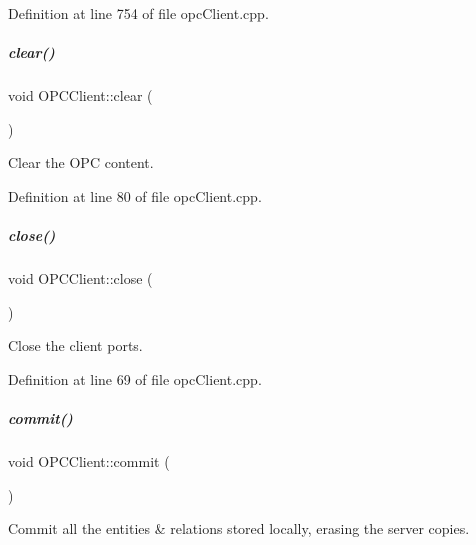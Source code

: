 Definition at line 754 of file opc\+Client.\+cpp.

\mbox{\label{group__icubclient__clients_ae884577090108846f1b0015818a2f13d}} 
\subparagraph{\texorpdfstring{clear()}{clear()}}
{\footnotesize\ttfamily void O\+P\+C\+Client\+::clear (\begin{DoxyParamCaption}{ }\end{DoxyParamCaption})}



Clear the O\+PC content. 



Definition at line 80 of file opc\+Client.\+cpp.

\mbox{\label{group__icubclient__clients_a4b193fe61992f927591ea0e5ff2a6f66}} 
\subparagraph{\texorpdfstring{close()}{close()}}
{\footnotesize\ttfamily void O\+P\+C\+Client\+::close (\begin{DoxyParamCaption}{ }\end{DoxyParamCaption})}



Close the client ports. 



Definition at line 69 of file opc\+Client.\+cpp.

\mbox{\label{group__icubclient__clients_a79bec5f248fcff8ae539b2cd285950a3}} 
\subparagraph{\texorpdfstring{commit()}{commit()}\hspace{0.1cm}{\footnotesize\ttfamily [1/2]}}
{\footnotesize\ttfamily void O\+P\+C\+Client\+::commit (\begin{DoxyParamCaption}{ }\end{DoxyParamCaption})}



Commit all the entities \& relations stored locally, erasing the server copies. 



